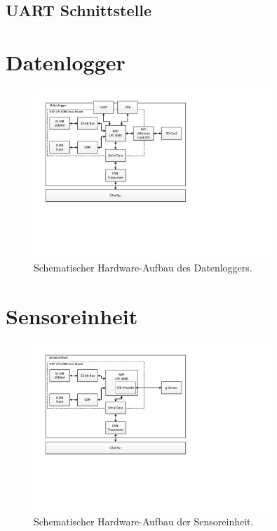 \subsection{UART Schnittstelle}

\section{Datenlogger}

\begin{figure}[H]
	\centering
		\includegraphics[width=0.8\textwidth]{images/visio/hardware_logger.pdf}
	\caption{Schematischer Hardware-Aufbau des Datenloggers.}
	\label{fig.hw_logger}
\end{figure}



\section{Sensoreinheit}

\begin{figure}[H]
	\centering
		\includegraphics[width=0.8\textwidth]{images/visio/hardware_sensor.pdf}
	\caption{Schematischer Hardware-Aufbau der Sensoreinheit.}
	\label{fig.hw_sensor}
\end{figure}


